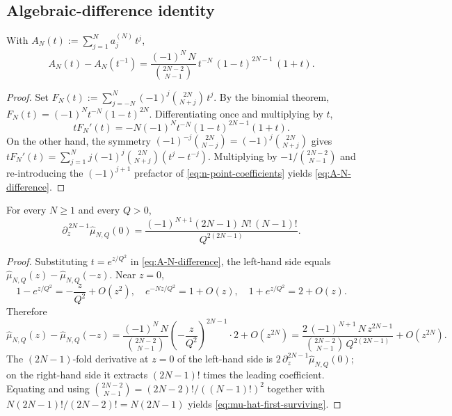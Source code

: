\subsection{Algebraic-difference identity}
\label{subsec:n-point-difference-identity}

\begin{lemma}
\label{lem:A-N-difference}
With \(A_N(t):=\sum_{j=1}^N a_j^{(N)}\, t^j\),
\begin{equation}
\label{eq:A-N-difference}
        A_N(t) - A_N(t^{-1})
        = \frac{(-1)^N\,N}{\binom{2N-2}{N-1}}\,
          t^{-N}\,(1-t)^{2N-1}\,(1+t).
\end{equation}
\end{lemma}

\begin{proof}
Set \(F_N(t):=\sum_{j=-N}^N(-1)^j\binom{2N}{N+j}\,t^j\).  By the
binomial theorem, \(F_N(t)=(-1)^N t^{-N}(1-t)^{2N}\).  Differentiating
once and multiplying by \(t\),
\[
        t F_N'(t) = -N(-1)^N t^{-N}(1-t)^{2N-1}(1+t).
\]
On the other hand, the symmetry
\((-1)^{-j}\binom{2N}{N-j}=(-1)^j\binom{2N}{N+j}\) gives
\(tF_N'(t)=\sum_{j=1}^N j(-1)^j\binom{2N}{N+j}(t^j - t^{-j})\).
Multiplying by \(-1/\binom{2N-2}{N-1}\) and re-introducing the
\((-1)^{j+1}\) prefactor of \eqref{eq:n-point-coefficients} yields
\eqref{eq:A-N-difference}.
\end{proof}

\begin{corollary}
\label{cor:n-point-first-surviving}
For every \(N\ge 1\) and every \(Q>0\),
\begin{equation}
\label{eq:mu-hat-first-surviving}
        \partial_z^{\,2N-1}\widehat\mu_{N,Q}(0)
        = \frac{(-1)^{N+1}(2N-1)\,N!\,(N-1)!}{Q^{2(2N-1)}}.
\end{equation}
\end{corollary}

\begin{proof}
Substituting \(t=e^{z/Q^2}\) in \eqref{eq:A-N-difference}, the
left-hand side equals
\(\widehat\mu_{N,Q}(z)-\widehat\mu_{N,Q}(-z)\).  Near \(z=0\),
\[
        1-e^{z/Q^2}=-\frac{z}{Q^2}+O(z^2),\quad
        e^{-Nz/Q^2}=1+O(z),\quad
        1+e^{z/Q^2}=2+O(z).
\]
Therefore
\[
        \widehat\mu_{N,Q}(z)-\widehat\mu_{N,Q}(-z)
        = \frac{(-1)^N\,N}{\binom{2N-2}{N-1}}\!
          \left(-\frac{z}{Q^2}\right)^{\!2N-1}\!\!\!\cdot 2
          + O(z^{2N})
        = \frac{2\,(-1)^{N+1}\,N\,z^{2N-1}}
               {\binom{2N-2}{N-1}\,Q^{2(2N-1)}}+O(z^{2N}).
\]
The \((2N-1)\)-fold derivative at \(z=0\) of the left-hand side is
\(2\,\partial_z^{2N-1}\widehat\mu_{N,Q}(0)\); on the right-hand side it
extracts \((2N-1)!\) times the leading coefficient.  Equating and using
\(\binom{2N-2}{N-1}=(2N-2)!/((N-1)!)^2\) together with
\(N(2N-1)!/(2N-2)!=N(2N-1)\) yields
\eqref{eq:mu-hat-first-surviving}.
\end{proof}

